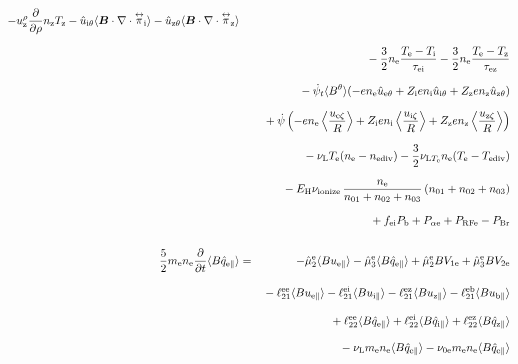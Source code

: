 \documentclass[11pt]{article}
\def\bvec#1{\leavevmode\hbox{\boldmath$#1$}}
\let\vec=\bvec
\def\r#1{{\rm#1}}
\def\ave#1{\left\langle#1\right\rangle}
\def\aves#1{\langle#1\rangle}
\def\dd#1#2{\frac{\partial #1}{\partial #2}}
\def\tensor#1{\mathord{\displaystyle\mathop{#1}^\leftrightarrow}}
\def\para{\parallel}
\def\ddrho{\frac{\partial}{\partial\rho}}
\def\ddt{\frac{\partial}{\partial t}}
\def\psid{\dot{\psi}}
\def\psit{\psi_t}
\def\psitd{\dot{\psit}}
\def\me{m_\r{e}}
\def\mb{m_\r{b}}
\def\nee{n_\r{e}}
\def\ni{n_\r{i}}
\def\nz{n_\r{z}}
\def\Te{T_\r{e}}
\def\Ti{T_\r{i}}
\def\Tz{T_\r{z}}
\def\Zi{Z_\r{i}}
\def\Zz{Z_\r{z}}
\def\uzt#1{u_{\r{#1}\zeta}}
\def\upara#1{u_{\r{#1}\para}}
\def\uhatth#1{\hat{u}_{\r{#1}\theta}}
\def\qhatpara#1{\hat{q}_{\r{#1}\para}}
\def\urho#1{u_\r{#1}^\rho}
\def\nun#1{\nu_\r{0#1}}
\def\ndiv#1{n_\r{#1div}}
\def\Tdiv#1{T_\r{#1div}}
\def\nuLT#1{\nu_{\r{L}T_\r{#1}}}
\def\PRF#1{P_\r{RF#1}}
\def\Palp#1{P_{\alpha\r{#1}}}
\def\fei{f_\r{ei}}
\def\PBr{P_\r{Br}}
\def\Pb{P_\r{b}}
\def\Eb{E_\r{b}}
\def\EH{E_\r{H}}
\def\nna{n_{01}}
\def\nnb{n_{02}}
\def\nnc{n_{03}}
\def\nuL{\nu_\r{L}}
\def\nuion{\nu_\r{ionize}}
\begin{document}
\begin{eqnarray}
  - \urho{z} \ddrho \nz  \Tz
  - \uhatth{i} \aves{\vec{B}\cdot\nabla\cdot\tensor{\pi}_\r{i}}
  - \uhatth{z} \aves{\vec{B}\cdot\nabla\cdot\tensor{\pi}_\r{z}}
\nonumber\\[2.5mm]&&{}
%
  - \frac{3}{2} \nee \frac{ \Te - \Ti }{\tau_\r{ei}}
  - \frac{3}{2} \nee \frac{ \Te - \Tz }{\tau_\r{ez}}
\nonumber\\[2.5mm]&&{}
%
%
  - \dot{\psi}_t \aves{B^\theta} (-     e \nee \uhatth{e}
                                  + \Zi e \ni  \uhatth{i}
                                  + \Zz e \nz  \uhatth{z})
\nonumber\\[2.5mm]&&{}
%
%
  +\dot{\psi}\left(-     e \nee \ave{\frac{\uzt{e}}{R}}
	           + \Zi e \ni  \ave{\frac{\uzt{i}}{R}}
	           + \Zz e \nz  \ave{\frac{\uzt{z}}{R}}\right)
\nonumber\\[2.5mm]&&{}
%
  - \nuL \Te (\nee - \ndiv{e})
%
  - \frac{3}{2} \nuLT{e} \nee (\Te - \Tdiv{e})
%
\nonumber\\[2.5mm]&&{}
  - \EH \nuion\, \frac{\nee}{\nna + \nnb + \nnc}\, (\nna + \nnb + \nnc)
\nonumber\\[2.5mm]&&{}
%
  + \fei \Pb
%
%
  + \Palp{e}
%
  + \PRF{e}
%
  - \PBr
\\[5mm]
 \frac{5}{2} \me \nee \ddt \aves{B \qhatpara{e}} &=&
%
  - \hat{\mu}_2^\r{e} \aves{B \upara{e}} 
  - \hat{\mu}_3^\r{e} \aves{B \qhatpara{e}}
%
  + \hat{\mu}_2^\r{e} {B V_{1\r{e}}} 
  + \hat{\mu}_3^\r{e} {B V_{2\r{e}}}
\nonumber\\[3mm]&&{}
%
  - \ell_{21}^{\r{ee}} \aves{B \upara{e}}
  - \ell_{21}^{\r{ei}} \aves{B \upara{i}}
  - \ell_{21}^{\r{ez}} \aves{B \upara{z}}
  - \ell_{21}^{\r{eb}} \aves{B \upara{b}}
\nonumber\\[3mm]&&{}
%
  + \ell_{22}^{\r{ee}} \aves{B \qhatpara{e}}
  + \ell_{22}^{\r{ei}} \aves{B \qhatpara{i}}
  + \ell_{22}^{\r{ez}} \aves{B \qhatpara{z}}
\nonumber\\[3mm]&&{}
%
  - \nuL \me \nee \aves{B \qhatpara{e}}
%
  - \nun{e} \me \nee \aves{B \qhatpara{e}}
\end{eqnarray}
%
\end{document}
